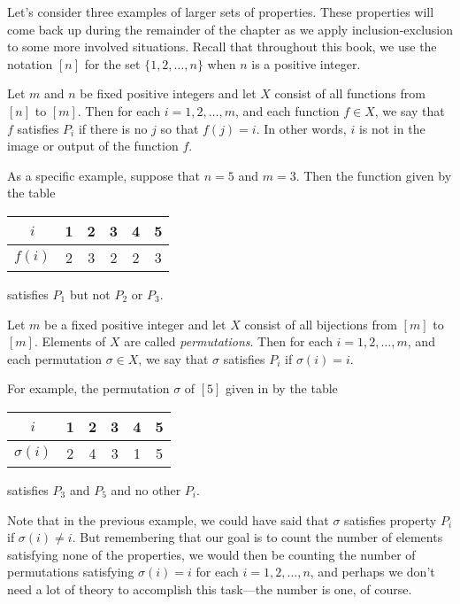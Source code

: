 Let's consider three examples of larger sets of properties. These
properties will come back up during the remainder of the chapter as we
apply inclusion-exclusion to some more involved situations. Recall
that throughout this book, we use the notation $[n]$ for the set
$\{1,2,\dots,n\}$ when $n$ is a positive integer.

\begin{example}\label{exa:inclusion-exclusion:prop-inject}
  Let $m$ and $n$ be fixed positive integers and let $X$ consist of
  all functions from $[n]$ to $[m]$.  Then for each $i=1,2,\dots,m$,
  and each function $f\in X$, we say that $f$ satisfies $P_i$ if there
  is no $j$ so that $f(j)=i$. In other words, $i$ is not in the image
  or output of the function $f$.

  As a specific example, suppose that $n=5$ and $m=3$. Then the
  function given by the table
  \begin{center}
    \begin{tabular}{c|c|c|c|c|c}
      $i$ & 1 & 2 & 3 & 4 & 5\\
      \hline
      $f(i)$ & 2 & 3 & 2 & 2 & 3
    \end{tabular}
  \end{center}
  satisfies $P_1$ but not $P_2$ or $P_3$.
\end{example} 

\begin{example}\label{exa:inclusion-exclusion:prop-derange} 
  Let $m$ be a fixed positive integer and let $X$ consist of all
  bijections from $[m]$ to $[m]$.  Elements of $X$ are called
  \textit{permutations}.  Then for each $i=1,2,\dots,m$, and each
  permutation $\sigma\in X$, we say that $\sigma$ satisfies $P_i$ if
  $\sigma(i)=i$.

  For example, the permutation $\sigma$ of $[5]$ given in by the table
  \begin{center}
    \begin{tabular}{c|c|c|c|c|c}
      $i$ & 1 & 2 & 3 & 4 & 5\\
      \hline
      $\sigma(i)$ & 2 & 4 & 3 & 1 & 5
    \end{tabular}
  \end{center}
  satisfies $P_3$ and $P_5$ and no other $P_i$.
\end{example} 
Note that in the previous example, we could have said that $\sigma$
satisfies property $P_i$ if $\sigma(i)\neq i$.  But remembering that
our goal is to count the number of elements satisfying none of the
properties, we would then be counting the number of permutations
satisfying $\sigma(i)=i$ for each $i=1,2,\dots,n$, and perhaps we
don't need a lot of theory to accomplish this task---the number is
one, of course.

